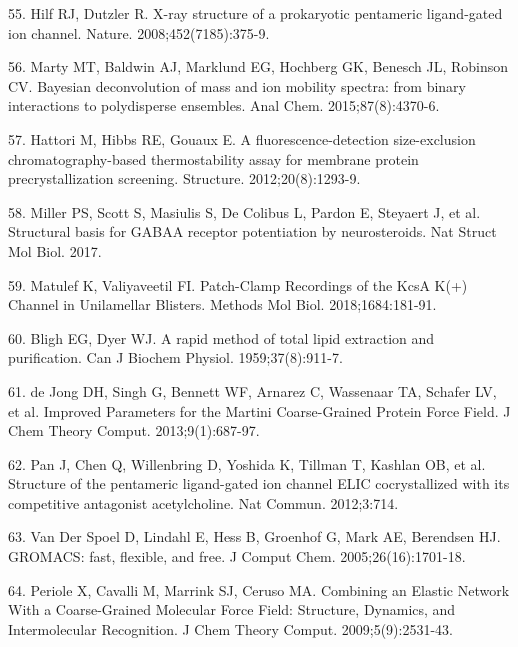 55. Hilf RJ, Dutzler R. X-ray structure of a prokaryotic pentameric
ligand-gated ion channel. Nature. 2008;452(7185):375-9.

56. Marty MT, Baldwin AJ, Marklund EG, Hochberg GK, Benesch JL, Robinson
CV. Bayesian deconvolution of mass and ion mobility spectra: from binary
interactions to polydisperse ensembles. Anal Chem. 2015;87(8):4370-6.

57. Hattori M, Hibbs RE, Gouaux E. A fluorescence-detection
size-exclusion chromatography-based thermostability assay for membrane
protein precrystallization screening. Structure. 2012;20(8):1293-9.

58. Miller PS, Scott S, Masiulis S, De Colibus L, Pardon E, Steyaert J,
et al. Structural basis for GABAA receptor potentiation by
neurosteroids. Nat Struct Mol Biol. 2017.

59. Matulef K, Valiyaveetil FI. Patch-Clamp Recordings of the KcsA K(+)
Channel in Unilamellar Blisters. Methods Mol Biol. 2018;1684:181-91.

60. Bligh EG, Dyer WJ. A rapid method of total lipid extraction and
purification. Can J Biochem Physiol. 1959;37(8):911-7.

61. de Jong DH, Singh G, Bennett WF, Arnarez C, Wassenaar TA, Schafer
LV, et al. Improved Parameters for the Martini Coarse-Grained Protein
Force Field. J Chem Theory Comput. 2013;9(1):687-97.

62. Pan J, Chen Q, Willenbring D, Yoshida K, Tillman T, Kashlan OB, et
al. Structure of the pentameric ligand-gated ion channel ELIC
cocrystallized with its competitive antagonist acetylcholine. Nat
Commun. 2012;3:714.

63. Van Der Spoel D, Lindahl E, Hess B, Groenhof G, Mark AE, Berendsen
HJ. GROMACS: fast, flexible, and free. J Comput Chem.
2005;26(16):1701-18.

64. Periole X, Cavalli M, Marrink SJ, Ceruso MA. Combining an Elastic
Network With a Coarse-Grained Molecular Force Field: Structure,
Dynamics, and Intermolecular Recognition. J Chem Theory Comput.
2009;5(9):2531-43.

